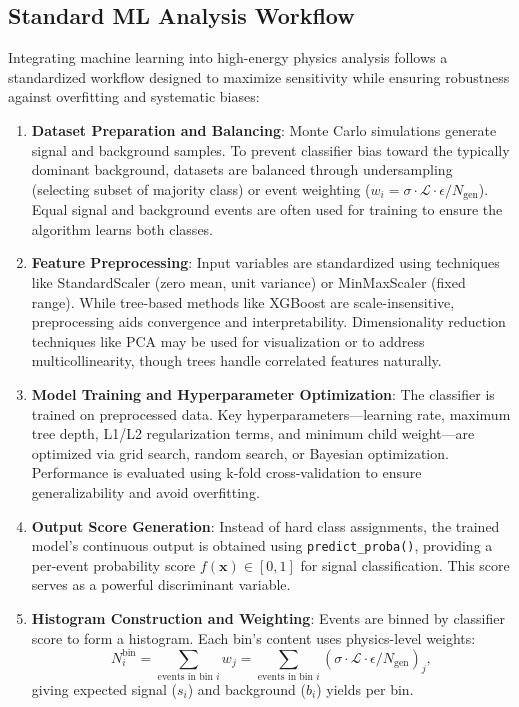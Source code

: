 \subsection{Standard ML Analysis Workflow}
\label{ssec:ml_workflow}

Integrating machine learning into high-energy physics analysis follows a standardized workflow designed to maximize sensitivity while ensuring robustness against overfitting and systematic biases:

\begin{enumerate}
    \item \textbf{Dataset Preparation and Balancing}: Monte Carlo simulations generate signal and background samples. To prevent classifier bias toward the typically dominant background, datasets are balanced through undersampling (selecting subset of majority class) or event weighting ($w_i = \sigma \cdot \mathcal{L} \cdot \epsilon / N_{\text{gen}}$). Equal signal and background events are often used for training to ensure the algorithm learns both classes.
    
    \item \textbf{Feature Preprocessing}: Input variables are standardized using techniques like StandardScaler (zero mean, unit variance) or MinMaxScaler (fixed range). While tree-based methods like XGBoost are scale-insensitive, preprocessing aids convergence and interpretability. Dimensionality reduction techniques like PCA may be used for visualization or to address multicollinearity, though trees handle correlated features naturally.
    
    \item \textbf{Model Training and Hyperparameter Optimization}: The classifier is trained on preprocessed data. Key hyperparameters—learning rate, maximum tree depth, L1/L2 regularization terms, and minimum child weight—are optimized via grid search, random search, or Bayesian optimization. Performance is evaluated using k-fold cross-validation to ensure generalizability and avoid overfitting.
    
    \item \textbf{Output Score Generation}: Instead of hard class assignments, the trained model's continuous output is obtained using \texttt{predict\_proba()}, providing a per-event probability score $f(\mathbf{x}) \in [0, 1]$ for signal classification. This score serves as a powerful discriminant variable.
    
    \item \textbf{Histogram Construction and Weighting}: Events are binned by classifier score to form a histogram. Each bin's content uses physics-level weights:
    \[
    N_i^{\text{bin}} = \sum_{\text{events in bin } i} w_j = \sum_{\text{events in bin } i} \left( \sigma \cdot \mathcal{L} \cdot \epsilon / N_{\text{gen}} \right)_j,
    \]
    giving expected signal ($s_i$) and background ($b_i$) yields per bin.
    

\end{enumerate}

